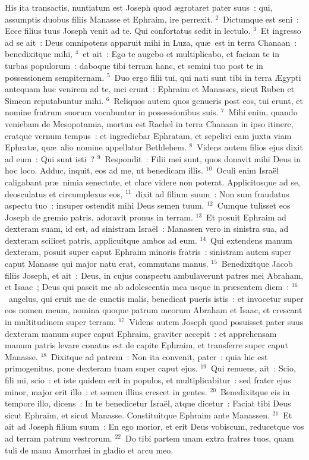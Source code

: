 \lettrine[lines=3,image=true,loversize=0.05,lraise=-0.03]{H}{}is ita transactis, nuntiatum est Joseph quod \ae grotaret pater suus~: qui, assumptis duobus filiis Manasse et Ephraim, ire perrexit.
${}^{2}$~Dictumque est seni~: Ecce filius tuus Joseph venit ad te. Qui confortatus sedit in lectulo.
${}^{3}$~Et ingresso ad se ait~: Deus omnipotens apparuit mihi in Luza, qu\ae\ est in terra Chanaan~: benedixitque mihi,
${}^{4}$~et ait~: Ego te augebo et multiplicabo, et faciam te in turbas populorum~: daboque tibi terram hanc, et semini tuo post te in possessionem sempiternam.
${}^{5}$~Duo ergo filii tui, qui nati sunt tibi in terra \AE gypti antequam huc venirem ad te, mei erunt~: Ephraim et Manasses, sicut Ruben et Simeon reputabuntur mihi.
${}^{6}$~Reliquos autem quos genueris post eos, tui erunt, et nomine fratrum suorum vocabuntur in possessionibus suis.
${}^{7}$~Mihi enim, quando veniebam de Mesopotamia, mortua est Rachel in terra Chanaan in ipso itinere, eratque vernum tempus~: et ingrediebar Ephratam, et sepelivi eam juxta viam Ephrat\ae , qu\ae\ alio nomine appellatur Bethlehem.
${}^{8}$~Videns autem filios ejus dixit ad eum~: Qui sunt isti~?
${}^{9}$~Respondit~: Filii mei sunt, quos donavit mihi Deus in hoc loco. Adduc, inquit, eos ad me, ut benedicam illis.
${}^{10}$~Oculi enim Isra\"el caligabant pr\ae\ nimia senectute, et clare videre non poterat. Applicitosque ad se, deosculatus et circumplexus eos,
${}^{11}$~dixit ad filium suum~: Non sum fraudatus aspectu tuo~: insuper ostendit mihi Deus semen tuum.
${}^{12}$~Cumque tulisset eos Joseph de gremio patris, adoravit pronus in terram.
${}^{13}$~Et posuit Ephraim ad dexteram suam, id est, ad sinistram Isra\"el~: Manassen vero in sinistra sua, ad dexteram scilicet patris, applicuitque ambos ad eum.
${}^{14}$~Qui extendens manum dexteram, posuit super caput Ephraim minoris fratris~: sinistram autem super caput Manasse qui major natu erat, commutans manus.
${}^{15}$~Benedixitque Jacob filiis Joseph, et ait~: Deus, in cujus conspectu ambulaverunt patres mei Abraham, et Isaac~; Deus qui pascit me ab adolescentia mea usque in pr\ae sentem diem~:
${}^{16}$~angelus, qui eruit me de cunctis malis, benedicat pueris istis~: et invocetur super eos nomen meum, nomina quoque patrum meorum Abraham et Isaac, et crescant in multitudinem super terram.
${}^{17}$~Videns autem Joseph quod posuisset pater suus dexteram manum super caput Ephraim, graviter accepit~: et apprehensam manum patris levare conatus est de capite Ephraim, et transferre super caput Manasse.
${}^{18}$~Dixitque ad patrem~: Non ita convenit, pater~: quia hic est primogenitus, pone dexteram tuam super caput ejus.
${}^{19}$~Qui renuens, ait~: Scio, fili mi, scio~: et iste quidem erit in populos, et multiplicabitur~: sed frater ejus minor, major erit illo~: et semen illius crescet in gentes.
${}^{20}$~Benedixitque eis in tempore illo, dicens~: In te benedicetur Isra\"el, atque dicetur~: Faciat tibi Deus sicut Ephraim, et sicut Manasse. Constituitque Ephraim ante Manassen.
${}^{21}$~Et ait ad Joseph filium suum~: En ego morior, et erit Deus vobiscum, reducetque vos ad terram patrum vestrorum.
${}^{22}$~Do tibi partem unam extra fratres tuos, quam tuli de manu Amorrh\ae i in gladio et arcu meo.

